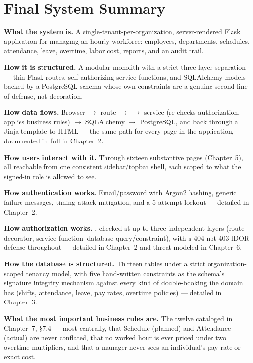 \section{Final System Summary}

\textbf{What the system is.} A single-tenant-per-organization,
server-rendered Flask application for managing an hourly workforce:
employees, departments, schedules, attendance, leave, overtime, labor
cost, reports, and an audit trail.

\textbf{How it is structured.} A modular monolith with a strict
three-layer separation --- thin Flask routes, self-authorizing service
functions, and SQLAlchemy models backed by a PostgreSQL schema whose
own constraints are a genuine second line of defense, not decoration.

\textbf{How data flows.} Browser $\to$ route $\to$ 
$\to$ service (re-checks authorization, applies business rules) $\to$
SQLAlchemy $\to$ PostgreSQL, and back through a Jinja template to HTML
--- the same path for every page in the application, documented in
full in Chapter~2.

\textbf{How users interact with it.} Through sixteen substantive pages
(Chapter~5), all reachable from one consistent sidebar/topbar shell,
each scoped to what the signed-in role is allowed to see.

\textbf{How authentication works.} Email/password with Argon2 hashing,
generic failure messages, timing-attack mitigation, and a 5-attempt
lockout --- detailed in Chapter~2.

\textbf{How authorization works.} , checked at up to
three independent layers (route decorator, service function, database
query/constraint), with a 404-not-403 IDOR defense throughout ---
detailed in Chapter~2 and threat-modeled in Chapter~6.

\textbf{How the database is structured.} Thirteen tables under a strict
organization-scoped tenancy model, with five hand-written
 constraints as the schema's signature
integrity mechanism against every kind of double-booking the domain
has (shifts, attendance, leave, pay rates, overtime policies) ---
detailed in Chapter~3.

\textbf{What the most important business rules are.} The twelve
cataloged in Chapter~7, \S7.4 --- most centrally, that Schedule
(planned) and Attendance (actual) are never conflated, that no worked
hour is ever priced under two overtime multipliers, and that a manager
never sees an individual's pay rate or exact cost.

